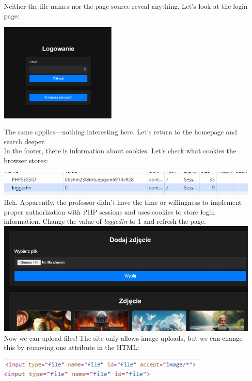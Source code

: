 \documentclass{article}
\begin{document}
Neither the file names nor the page source reveal anything. Let’s look at the login page:
\begin{multicols}{2}
    \begin{center}
        \includegraphics[width=0.44\textwidth]{"image39.png"}
    \end{center}
    \columnbreak
    The same applies—nothing interesting here. Let’s return to the homepage and search deeper.
    \vspace{3mm} \\
    In the footer, there is information about cookies. Let’s check what cookies the browser stores:
\end{multicols}
\includegraphics[width=\textwidth]{"image40.png"}
Heh. Apparently, the professor didn’t have the time or willingness to implement proper authorization with PHP sessions and uses cookies to store login information. Change the value of \textit{loggedin} to 1 and refresh the page. \\
\includegraphics[width=\textwidth]{"image41.jpeg"}
Now we can upload files! The site only allows image uploads, but we can change this by removing one attribute in the HTML:
\begin{center}
    \includegraphics[width=0.8\textwidth]{"image42.png"}
    \vspace{3mm} \\
    \includegraphics[width=0.6\textwidth]{"image43.png"}
\end{center}
\end{document}
